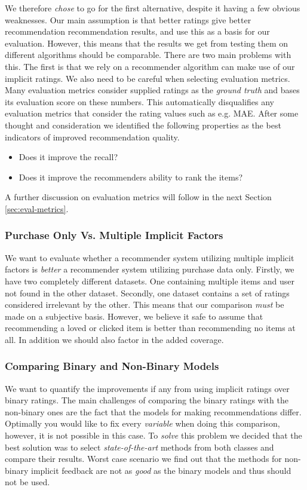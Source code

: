 We therefore \emph{chose} to go for the first alternative, despite it having a few obvious weaknesses.
Our main assumption is that better ratings give better recommendation recommendation results, and use this
as a basis for our evaluation. However, this means that the results we get from testing them
on different algorithms should be comparable. There are two main problems with this. The first is that
we rely on a recommender algorithm can make use of our implicit ratings. We also need to be careful
when selecting evaluation metrics. Many evaluation metrics consider supplied ratings as the \emph{ground truth}
and bases its evaluation score on these numbers. This automatically disqualifies any evaluation metrics
that consider the rating values such as e.g. MAE. After some thought and consideration
we identified the following properties as the best indicators of improved recommendation quality.

\begin{itemize}
\item Does it improve the recall?
\item Does it improve the recommenders ability to rank the items?
\end{itemize}

A further discussion on evaluation metrics will follow in the next Section \ref{sec:eval-metrics}.

\subsubsection{Purchase Only Vs. Multiple Implicit Factors}


We want to evaluate whether a recommender system utilizing multiple implicit factors is \emph{better}
a recommender system utilizing purchase data only. Firstly, we have two completely different datasets.
One containing multiple items and user not found in the other dataset. Secondly, one dataset
contains a set of ratings considered irrelevant by the other. This means that our comparison
\emph{must} be made on a subjective basis. However, we believe it safe to assume that recommending
a loved or clicked item is better than recommending no items at all. In addition we should also
factor in the added coverage.

\subsubsection{Comparing Binary and Non-Binary Models}

We want to quantify the improvements if any from using implicit ratings over binary ratings.
The main challenges of comparing the binary ratings with the non-binary ones are the fact
that the models for making recommendations differ. Optimally you would like to fix every
\emph{variable} when doing this comparison, however, it is not possible in this case.
To \emph{solve} this problem we decided that the best solution was to select \emph{state-of-the-art}
methods from both classes and compare their results. Worst case scenario we find out that the
methods for non-binary implicit feedback are not as \emph{good} as the binary models and thus
should not be used.

